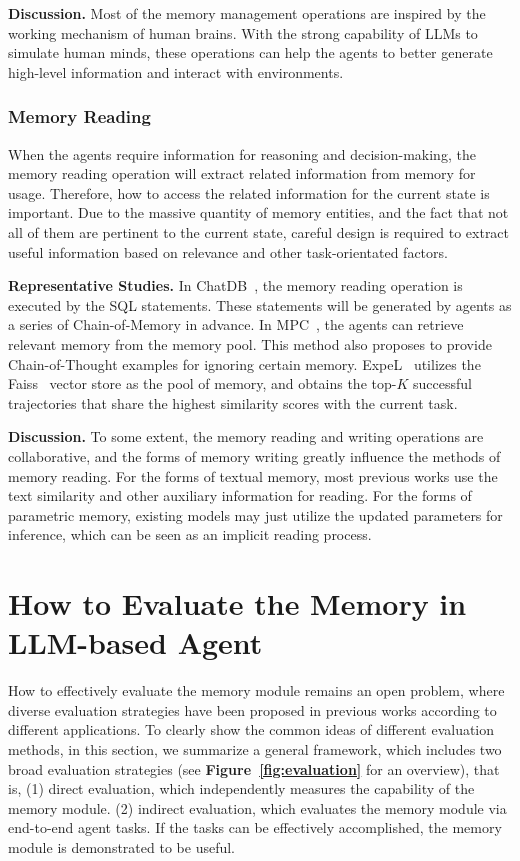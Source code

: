 \documentclass{article}
\theoremstyle{definition}
\theoremstyle{theorem}
\theoremstyle{proof}
\theoremstyle{remark}
\begin{document}
	\textbf{Discussion.}
	Most of the memory management operations are inspired by the working mechanism of human brains. With the strong capability of LLMs to simulate human minds, these operations can help the agents to better generate high-level information and interact with environments.
	
	
	\subsubsection{Memory Reading}
	When the agents require information for reasoning and decision-making, the memory reading operation will extract related information from memory for usage. Therefore, how to access the related information for the current state is important. Due to the massive quantity of memory entities, and the fact that not all of them are pertinent to the current state, careful design is required to extract useful information based on relevance and other task-orientated factors.
	
	\textbf{Representative Studies.}
	In ChatDB~\cite{chatdb}, the memory reading operation is executed by the SQL statements. These statements will be generated by agents as a series of Chain-of-Memory in advance.
	In MPC~\cite{mpc}, the agents can retrieve relevant memory from the memory pool. This method also proposes to provide Chain-of-Thought examples for ignoring certain memory.
	ExpeL~\cite{expel} utilizes the Faiss~\cite{faiss} vector store as the pool of memory, and obtains the top-$K$ successful trajectories that share the highest similarity scores with the current task.
	
	\textbf{Discussion.}
	To some extent, the memory reading and writing operations are collaborative, and the forms of memory writing greatly influence the methods of memory reading. For the forms of textual memory, most previous works use the text similarity and other auxiliary information for reading. For the forms of parametric memory, existing models may just utilize the updated parameters for inference, which can be seen as an implicit reading process.
	
	
	\section{How to Evaluate the Memory in LLM-based Agent}
	\label{sec:evaluation}
	How to effectively evaluate the memory module remains an open problem, where diverse evaluation strategies have been proposed in previous works according to different applications. To clearly show the common ideas of different evaluation methods, in this section, we summarize a general framework, which includes two broad evaluation strategies (see \textbf{Figure~\ref{fig:evaluation}} for an overview), that is, (1) direct evaluation, which independently measures the capability of the memory module. 
	(2) indirect evaluation, which evaluates the memory module via end-to-end agent tasks. 
	If the tasks can be effectively accomplished, the memory module is demonstrated to be useful. 
	
\end{document}
